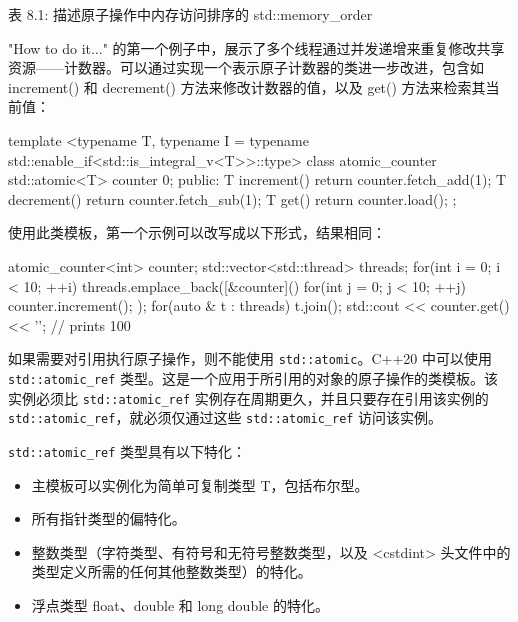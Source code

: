 \begin{center}
表 8.1: 描述原子操作中内存访问排序的 std::memory\_order
\end{center}

"How to do it..." 的第一个例子中，展示了多个线程通过并发递增来重复修改共享资源——计数器。可以通过实现一个表示原子计数器的类进一步改进，包含如 increment() 和 decrement() 方法来修改计数器的值，以及 get() 方法来检索其当前值：

\begin{cpp}
template <typename T,
          typename I =
            typename std::enable_if<std::is_integral_v<T>>::type>
class atomic_counter
{
    std::atomic<T> counter {0};
    public:
    T increment()
    {
        return counter.fetch_add(1);
    }
    T decrement()
    {
        return counter.fetch_sub(1);
    }
    T get()
    {
        return counter.load();
    }
};
\end{cpp}

使用此类模板，第一个示例可以改写成以下形式，结果相同：

\begin{cpp}
atomic_counter<int> counter;
std::vector<std::thread> threads;
for(int i = 0; i < 10; ++i)
{
    threads.emplace_back([&counter](){
        for(int j = 0; j < 10; ++j)
        counter.increment();
    });
}
for(auto & t : threads) t.join();
std::cout << counter.get() << '\n'; // prints 100
\end{cpp}

如果需要对引用执行原子操作，则不能使用 \verb|std::atomic|。C++20 中可以使用 \verb|std::atomic_ref| 类型。这是一个应用于所引用的对象的原子操作的类模板。该实例必须比 \verb|std::atomic_ref| 实例存在周期更久，并且只要存在引用该实例的 \verb|std::atomic_ref|，就必须仅通过这些 \verb|std::atomic_ref| 访问该实例。

\verb|std::atomic_ref| 类型具有以下特化：

\begin{itemize}
\item
主模板可以实例化为简单可复制类型 T，包括布尔型。

\item
所有指针类型的偏特化。

\item
整数类型（字符类型、有符号和无符号整数类型，以及 <cstdint> 头文件中的类型定义所需的任何其他整数类型）的特化。

\item
浮点类型 float、double 和 long double 的特化。
\end{itemize}

